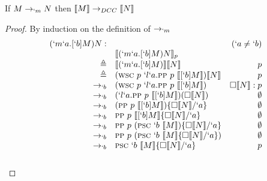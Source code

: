\begin{theorem}
If $M \rightarrow_{`m} N$ then $\llbracket M \rrbracket \rightarrow_{DCC} \llbracket N \rrbracket$
\end{theorem}

\begin{proof}{By induction on the definition of $\rightarrow_{`m}$}
\[
\begin{array}{rlrr}
  (`m`a.[`b]M) N:  & & (`a \neq `b) \\
  & \llbracket (`m`a.[`b]M) N \rrbracket_{p} \\
  \triangleq & \llbracket (`m`a.[`b]M) \rrbracket \llbracket N \rrbracket & p \\
  \triangleq & (\textsc{wsc}\ p\ `l`a.\textsc{pp}\ p\ \llbracket [`b]M \rrbracket) \llbracket N \rrbracket & p \\
  \rightarrow_{`b} & (\textsc{wsc}\ p\ `l`a.\textsc{pp}\ p\ \llbracket [`b]M \rrbracket) & \square\llbracket N \rrbracket:p \\
  \rightarrow_{`b} & (`l`a.\textsc{pp}\ p\ \llbracket [`b]M \rrbracket)(\square\llbracket N \rrbracket) & \emptyset \\
  \rightarrow_{`b} & (\textsc{pp}\ p\ \llbracket [`b]M \rrbracket)\{\square\llbracket N \rrbracket/`a\} & \emptyset \\
  \rightarrow_{`b} & \textsc{pp}\ p\ \llbracket [`b]M \rrbracket\{\square\llbracket N \rrbracket/`a\} & \emptyset \\
  \rightarrow_{`b} & \textsc{pp}\ p\ (\textsc{psc}\ `b\ \llbracket M \rrbracket)\{\square\llbracket N \rrbracket/`a\} & \emptyset \\
  \rightarrow_{`b} & \textsc{pp}\ p\ (\textsc{psc}\ `b\ \llbracket M \rrbracket\{\square\llbracket N \rrbracket/`a\}) & \emptyset \\
  \rightarrow_{`b} & \textsc{psc}\ `b\ \llbracket M \rrbracket\{\square\llbracket N \rrbracket/`a\} & p \\
  \\ 

\end{array}\]
\end{proof}
